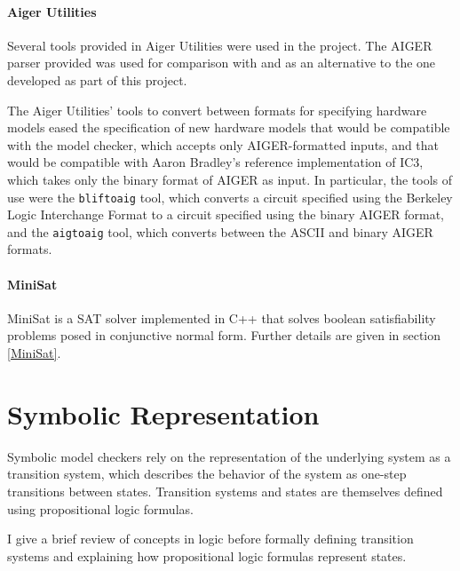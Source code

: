 \documentclass[12pt,a4paper,twoside,openright]{report}
\begin{document}
\paragraph{Aiger Utilities}{
Several tools provided in Aiger Utilities were used in the project. The
AIGER parser provided was used for comparison with and as an alternative
to the one developed as part of this project. 

The Aiger Utilities' tools to convert between formats for specifying
hardware models eased the specification of new hardware models that would
be compatible with the model checker, which accepts only AIGER-formatted inputs,
and that would be compatible with  Aaron Bradley's reference implementation of IC3,
which takes only the binary format of AIGER as input.
In particular, the tools of use were
the {\tt bliftoaig}
tool, which converts a circuit specified using the Berkeley Logic Interchange Format
to a circuit specified using the binary AIGER format, and the {\tt aigtoaig} tool,
which converts between the ASCII and binary AIGER formats.
}

\paragraph{MiniSat}{
MiniSat is a SAT solver implemented in C++ that solves boolean satisfiability problems
posed in conjunctive normal form. Further details are given in section \ref{MiniSat}.
}

\section{Symbolic Representation}
\label{logic}

Symbolic model checkers rely on the representation of the underlying system as a
transition system, which describes the behavior of the system as one-step transitions
between states. Transition systems and states are themselves defined using
propositional logic formulas.

I give a brief review of concepts in logic before formally defining transition systems
and explaining how propositional logic formulas represent states.
\end{document}
